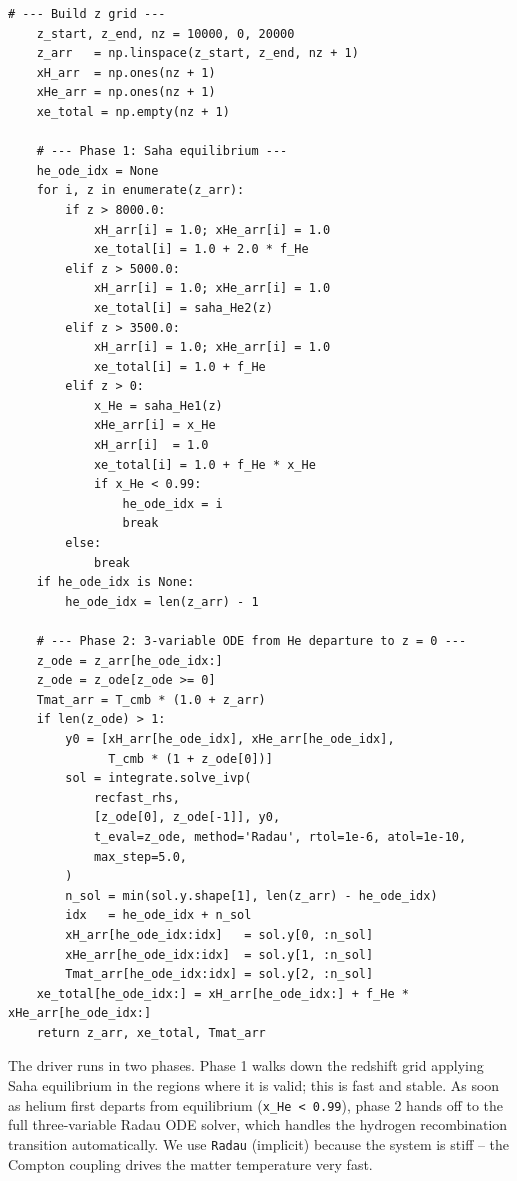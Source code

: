 \begin{codebox}
\begin{lstlisting}[style=python]
    # --- Build z grid ---
    z_start, z_end, nz = 10000, 0, 20000
    z_arr   = np.linspace(z_start, z_end, nz + 1)
    xH_arr  = np.ones(nz + 1)
    xHe_arr = np.ones(nz + 1)
    xe_total = np.empty(nz + 1)

    # --- Phase 1: Saha equilibrium ---
    he_ode_idx = None
    for i, z in enumerate(z_arr):
        if z > 8000.0:
            xH_arr[i] = 1.0; xHe_arr[i] = 1.0
            xe_total[i] = 1.0 + 2.0 * f_He
        elif z > 5000.0:
            xH_arr[i] = 1.0; xHe_arr[i] = 1.0
            xe_total[i] = saha_He2(z)
        elif z > 3500.0:
            xH_arr[i] = 1.0; xHe_arr[i] = 1.0
            xe_total[i] = 1.0 + f_He
        elif z > 0:
            x_He = saha_He1(z)
            xHe_arr[i] = x_He
            xH_arr[i]  = 1.0
            xe_total[i] = 1.0 + f_He * x_He
            if x_He < 0.99:
                he_ode_idx = i
                break
        else:
            break
    if he_ode_idx is None:
        he_ode_idx = len(z_arr) - 1

    # --- Phase 2: 3-variable ODE from He departure to z = 0 ---
    z_ode = z_arr[he_ode_idx:]
    z_ode = z_ode[z_ode >= 0]
    Tmat_arr = T_cmb * (1.0 + z_arr)
    if len(z_ode) > 1:
        y0 = [xH_arr[he_ode_idx], xHe_arr[he_ode_idx],
              T_cmb * (1 + z_ode[0])]
        sol = integrate.solve_ivp(
            recfast_rhs,
            [z_ode[0], z_ode[-1]], y0,
            t_eval=z_ode, method='Radau', rtol=1e-6, atol=1e-10,
            max_step=5.0,
        )
        n_sol = min(sol.y.shape[1], len(z_arr) - he_ode_idx)
        idx   = he_ode_idx + n_sol
        xH_arr[he_ode_idx:idx]   = sol.y[0, :n_sol]
        xHe_arr[he_ode_idx:idx]  = sol.y[1, :n_sol]
        Tmat_arr[he_ode_idx:idx] = sol.y[2, :n_sol]
    xe_total[he_ode_idx:] = xH_arr[he_ode_idx:] + f_He * xHe_arr[he_ode_idx:]
    return z_arr, xe_total, Tmat_arr
\end{lstlisting}
\end{codebox}

\noindent The driver runs in two phases. Phase 1 walks down the redshift grid applying Saha equilibrium in the regions where it is valid; this is fast and stable. As soon as helium first departs from equilibrium (\texttt{x\_He < 0.99}), phase 2 hands off to the full three-variable Radau ODE solver, which handles the hydrogen recombination transition automatically. We use \texttt{Radau} (implicit) because the system is stiff -- the Compton coupling drives the matter temperature very fast.

